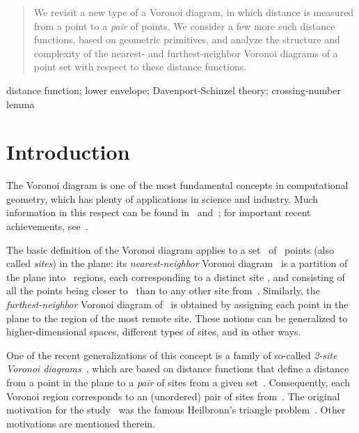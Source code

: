 \documentclass[10pt, conference, compsocconf]{IEEEtran}
\begin{document}
\maketitle



\begin{abstract}
   We revisit a new type of a Voronoi diagram, in which
   distance is measured from a point to a \emph{pair} of points.
   We consider a few more such distance functions, based on geometric primitives, and analyze the structure and complexity of the nearest- and furthest-neighbor Voronoi
   diagrams of a point set with respect to these distance functions.
\end{abstract}

\begin{IEEEkeywords}
   distance function; lower envelope;
   Davenport-Schinzel theory; crossing-number lemma
\end{IEEEkeywords}

\IEEEpeerreviewmaketitle



\section{Introduction}

The Voronoi diagram is one of the most fundamental concepts in computational
geometry, which has plenty of applications in science and industry.  Much
information in this respect can be found in~\cite{Au91} and~\cite{OBS00};
for important recent achievements, see~\cite{G08}.

The basic definition of the Voronoi diagram applies to a set~ of~
points (also called \emph{sites}) in the plane: its \emph{nearest-neighbor}
Voronoi diagram~ is a partition of the plane into~ regions, each
corresponding to a distinct site , and consisting of all the points
being closer to~ than to any other site from~.  Similarly, the
\emph{furthest-neighbor} Voronoi diagram of~ is obtained by assigning
each point in the plane to the region of the most remote site.  These
notions can be generalized to higher-dimensional spaces, different types of
sites, and in other ways.

One of the recent generalizations of this concept is a family of so-called
\emph{2-site Voronoi diagrams}~\cite{BDD02}, which are based on distance
functions that define a distance from a point in the plane to a \emph{pair}
of sites from a given set~.  Consequently, each Voronoi region corresponds
to an (unordered) pair of sites from~.
The original motivation for the study~\cite{BDD02} was the famous
Heilbronn's triangle problem~\cite{Ro51}.  Other motivations are mentioned
therein.
\end{document}
